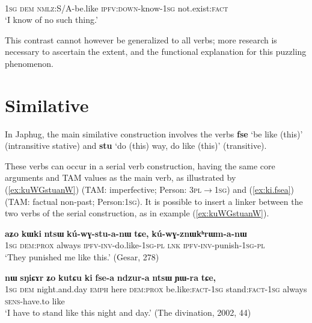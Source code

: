 \documentclass[oneside,a4paper,11pt]{article}
\newcommand{\ipa}[1]{{\phon\textbf{#1}}}
\newcommand{\forme}[2]{\ipa{#1} `#2'}
\begin{document}
\begin{exe}
\ex \label{ex:pjWsWza}
\gll [\ipa{aʑo} 	\ipa{nɯ} 	\ipa{kɯ-fse} 	\ipa{pjɯ-sɯz-a}]	\ipa{me} \\
\textsc{1sg} \textsc{dem} \textsc{nmlz}:S/A-be.like \textsc{ipfv:down}-know-\textsc{1sg} not.exist:\textsc{fact} \\
\glt `I know of no such thing.'
\end{exe}

This contrast cannot however be generalized to all verbs; more research is necessary to ascertain the extent, and the functional explanation for this puzzling phenomenon.

\section{Similative} \label{sec:similative}
In Japhug, the main similative construction involves the verbs \forme{fse}{be like (this)} (intransitive stative) and \forme{stu}{do (this) way, do like (this)} (transitive).

These verbs can occur in a serial verb construction, having the same core arguments and TAM values as the main verb, as illustrated by  (\ref{ex:kuWGstuanW}) (TAM: imperfective; Person: \textsc{3pl$\rightarrow$1sg}) and (\ref{ex:ki.fsea}) (TAM: factual non-past; Person:\textsc{1sg}).  It is possible to insert a linker between the two verbs of the serial construction, as in example (\ref{ex:kuWGstuanW}). 

\begin{exe}
\ex \label{ex:kuWGstuanW}
\gll 	
 \ipa{aʑo} 	\ipa{kɯki} 	\ipa{ntsɯ} 	\ipa{kú-wɣ-stu-a-nɯ} 	\ipa{tɕe,} 	\ipa{kú-wɣ-znɯkʰrɯm-a-nɯ} \\
 \textsc{1sg} \textsc{dem:prox} always \textsc{ipfv-inv}-do.like-\textsc{1sg-pl} \textsc{lnk} \textsc{ipfv-inv}-punish-\textsc{1sg-pl} \\
 \glt `They punished me like this.' (Gesar, 278)
\end{exe}	


\begin{exe}
\ex \label{ex:ki.fsea}
\gll \ipa{aʑo} 	\ipa{nɯ} 	\ipa{sŋiɕɤr} 	\ipa{ʑo} 	\ipa{kutɕu} 	\ipa{ki} 	\ipa{fse-a} 	\ipa{ndzur-a} 	\ipa{ntsɯ} 	\ipa{ɲɯ-ra} 	\ipa{tɕe,} \\
\textsc{1sg} \textsc{dem} night.and.day \textsc{emph} here \textsc{dem:prox} be.like:\textsc{fact-1sg} stand:\textsc{fact-1sg} always \textsc{sens}-have.to like \\
\glt `I have to stand like this night and day.' (The divination, 2002, 44)
\end{exe}
\end{document}

